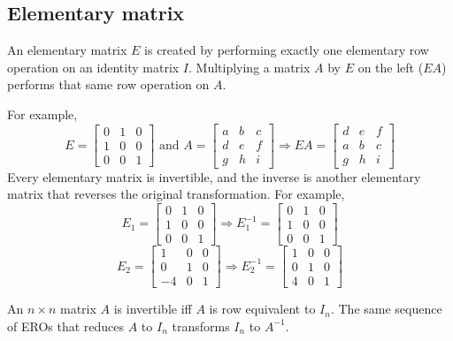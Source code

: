 \documentclass[../linear-algebra.tex]{subfiles}
\begin{document}
\subsection{Elementary matrix}
An elementary matrix $E$ is created by performing exactly one elementary row operation
on an identity matrix $I$. \newline
Multiplying a matrix $A$ by $E$ on the left ($EA$)
performs that same row operation on $A$.

\noindent For example,
\[E = \begin{bmatrix}
    0 & 1 & 0 \\
    1 & 0 & 0 \\
    0 & 0 & 1
\end{bmatrix} \text{ and }A=\begin{bmatrix}
    a & b & c \\
    d & e & f \\
    g & h & i
\end{bmatrix}\Rightarrow EA=\begin{bmatrix}
    d & e & f \\
    a & b & c \\
    g & h & i
\end{bmatrix}\]
Every elementary matrix is invertible, and the inverse is another
elementary matrix that reverses the original transformation.
For example,
\[E_1=\begin{bmatrix}
    0 & 1 & 0 \\
    1 & 0 & 0 \\
    0 & 0 & 1
\end{bmatrix} \Rightarrow E_1^{-1}=\begin{bmatrix}
    0 & 1 & 0 \\
    1 & 0 & 0 \\
    0 & 0 & 1
\end{bmatrix}\]
\[E_2=\begin{bmatrix}
    1 & 0 & 0 \\
    0 & 1 & 0 \\
    -4 & 0 & 1
\end{bmatrix} \Rightarrow E_2^{-1}=\begin{bmatrix}
    1 & 0 & 0 \\
    0 & 1 & 0 \\
    4 & 0 & 1
\end{bmatrix}\]

\bigskip

\noindent An $n\times n$ matrix $A$ is invertible iff $A$ is row equivalent
to $I_n$. The same sequence of EROs that reduces $A$ to $I_n$ transforms $I_n$ to $A^{-1}$.
\end{document}
